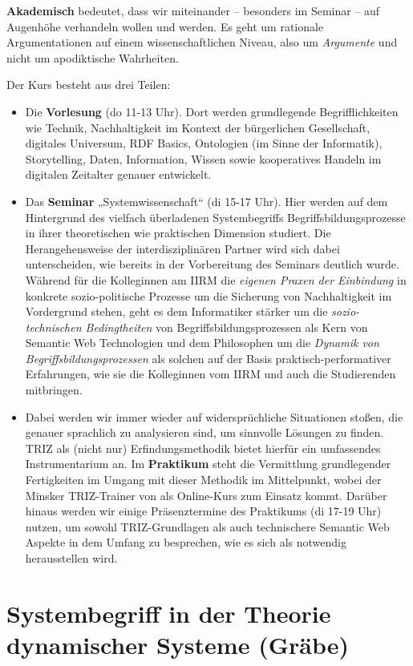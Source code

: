 \documentclass[11pt,a4paper]{article}
\begin{document}
\textbf{Akademisch} bedeutet, dass wir miteinander -- besonders im Seminar --
auf Augenhöhe verhandeln wollen und werden. Es geht um rationale
Argumentationen auf einem wissenschaftlichen Niveau, also um \emph{Argumente}
und nicht um apodiktische Wahrheiten.

Der Kurs besteht aus drei Teilen:
\begin{itemize}
\item Die \textbf{Vorlesung} (do 11-13 Uhr). Dort werden grundlegende
  Begriff\-lichkeiten wie Technik, Nachhaltigkeit im Kontext der bürgerlichen
  Gesellschaft, digitales Universum, RDF Basics, Ontologien (im Sinne der
  Informatik), Storytelling, Daten, Information, Wissen sowie kooperatives
  Handeln im digitalen Zeitalter genauer entwickelt.
\item Das \textbf{Seminar} „Systemwissenschaft“ (di 15-17 Uhr). Hier werden
  auf dem Hintergrund des vielfach überladenen Systembegriffs
  Begriffsbildungsprozesse in ihrer theoretischen wie praktischen Dimension
  studiert. Die Herangehensweise der interdisziplinären Partner wird sich
  dabei unterscheiden, wie bereits in der Vorbereitung des Seminars deutlich
  wurde. Während für die Kolleginnen am IIRM die \emph{eigenen Praxen der
    Einbindung} in konkrete sozio-politische Prozesse um die Sicherung von
  Nachhaltigkeit im Vordergrund stehen, geht es dem Informatiker stärker um
  die \emph{sozio-technischen Bedingtheiten} von Begriffsbildungsprozessen als
  Kern von Semantic Web Technologien und dem Philosophen um die \emph{Dynamik
    von Begriffsbildungsprozessen} als solchen auf der Basis
  praktisch-performativer Erfahrungen, wie sie die Kolleginnen vom IIRM und
  auch die Studierenden mitbringen.
\item Dabei werden wir immer wieder auf widersprüchliche Situationen stoßen,
  die genauer sprachlich zu analysieren sind, um sinnvolle Lösungen zu
  finden. TRIZ als (nicht nur) Erfindungsmethodik bietet hierfür ein
  umfassendes Instrumentarium an. Im \textbf{Praktikum} steht die Vermittlung
  grundlegender Fertigkeiten im Umgang mit dieser Methodik im Mittelpunkt,
  wobei der Minsker TRIZ-Trainer von als Online-Kurs zum Einsatz kommt.
  Darüber hinaus werden wir einige Präsenztermine des Praktikums (di 17-19
  Uhr) nutzen, um sowohl TRIZ-Grundlagen als auch technischere Semantic Web
  Aspekte in dem Umfang zu besprechen, wie es sich als notwendig herausstellen
  wird.
\end{itemize}

\section{Systembegriff in der Theorie dynamischer Systeme (Gräbe)}
\end{document}
